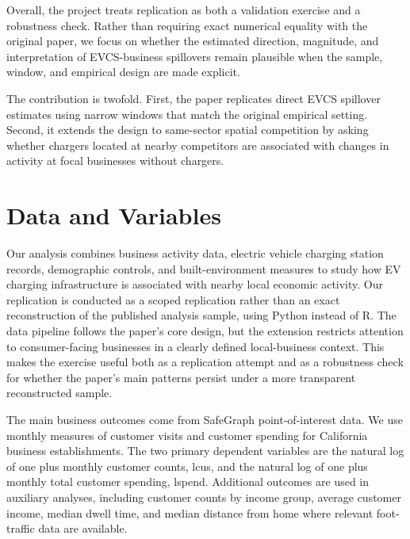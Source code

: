 \documentclass[12pt]{article}
\begin{document}
Overall, the project treats replication as both a validation exercise and a robustness check. Rather than requiring exact numerical equality with the original paper, we focus on whether the estimated direction, magnitude, and interpretation of EVCS-business spillovers remain plausible when the sample, window, and empirical design are made explicit.


The contribution is twofold. First, the paper replicates direct EVCS spillover estimates using narrow windows that match the original empirical setting. Second, it extends the design to same-sector spatial competition by asking whether chargers located at nearby competitors are associated with changes in activity at focal businesses without chargers.


\section{Data and Variables}
Our analysis combines business activity data, electric vehicle charging station records, demographic controls, and built-environment measures to study how EV charging infrastructure is associated with nearby local economic activity. Our replication is conducted as a scoped replication rather than an exact reconstruction of the published analysis sample, using Python instead of R. The data pipeline follows the paper’s core design, but the extension restricts attention to consumer-facing businesses in a clearly defined local-business context. This makes the exercise useful both as a replication attempt and as a robustness check for whether the paper’s main patterns persist under a more transparent reconstructed sample.

The main business outcomes come from SafeGraph point-of-interest data. We use monthly measures of customer visits and customer spending for California business establishments. The two primary dependent variables are the natural log of one plus monthly customer counts, lcus, and the natural log of one plus monthly total customer spending, lspend. Additional outcomes are used in auxiliary analyses, including customer counts by income group, average customer income, median dwell time, and median distance from home where relevant foot-traffic data are available.
\end{document}
